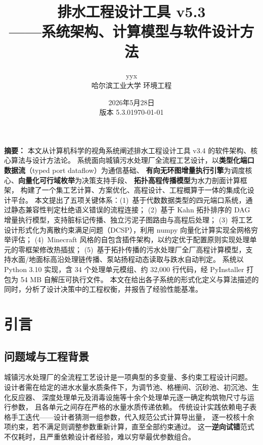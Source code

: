 \documentclass[12pt,a4paper]{ctexart}
\title{\textbf{排水工程设计工具 v5.3}\\[4pt]
       \large ——系统架构、计算模型与软件设计方法}
\author{yyx \\[2pt] \normalsize 哈尔滨工业大学 环境工程}
\date{2026年5月28日 \\ 版本 5.3.0}
\date{\today}
\theoremstyle{definition}
\theoremstyle{remark}
\begin{document}
\maketitle

\begin{center}
\begin{minipage}{0.92\textwidth}
\small\setlength{\parskip}{4pt}
\textbf{摘要：}
本文从计算机科学的视角系统阐述排水工程设计工具 v3.4 的软件架构、核心算法与设计方法论。
系统面向城镇污水处理厂全流程工艺设计，以\textbf{类型化端口数据流}（typed port dataflow）为通信基础、
\textbf{有向无环图增量执行引擎}为调度核心、\textbf{向量化可行域枚举}为决策支持手段、
\textbf{拓扑高程传播模型}为水力剖面计算框架，
构建了一个集工艺计算、方案优化、高程设计、工程概算于一体的集成化设计平台。
本文提出了五项关键体系：(1)~基于代数数据类型的四元端口系统，通过静态兼容性判定杜绝语义错误的流程连接；
(2)~基于 Kahn 拓扑排序的 DAG 增量执行模型，支持脏标记传播、独立污泥子图路由与高程后处理；
(3)~将工艺设计形式化为离散约束满足问题（DCSP），利用 numpy 向量化计算实现全网格穷举评估；
(4)~Minecraft 风格的自包含插件架构，以约定优于配置原则实现处理单元的零框架修改热插拔；
(5)~基于拓扑传播的污水处理厂全厂高程计算模型，支持水面/地面标高沿处理链传播、泵站扬程动态读取与跌水自动判定。
系统以 Python 3.10 实现，含 34 个处理单元模组、约 32,000 行代码，经 PyInstaller 打包为 54 MB 自解压可执行文件。
本文在给出各子系统的形式化定义与算法描述的同时，分析了设计决策中的工程权衡，并报告了经验性能基准。
\end{minipage}
\end{center}

\tableofcontents
\newpage

\section{引言}

\subsection{问题域与工程背景}

城镇污水处理厂的全流程工艺设计是一项典型的多变量、多约束工程设计问题。
设计者需在给定的进水水量水质条件下，为调节池、格栅间、沉砂池、初沉池、生化反应器、
深度处理单元及消毒设施等十余个处理单元逐一确定构筑物尺寸与运行参数，
且各单元之间存在严格的水量水质传递依赖。
传统设计实践依赖电子表格手工迭代——设计者猜测一组参数，代入规范公式计算导出量，
逐一校核十余项约束，若不满足则调整参数重新计算，直至全部约束通过。
这一\textbf{逆向试错}范式不仅耗时，且严重依赖设计者经验，难以穷举最优参数组合。
\end{document}

